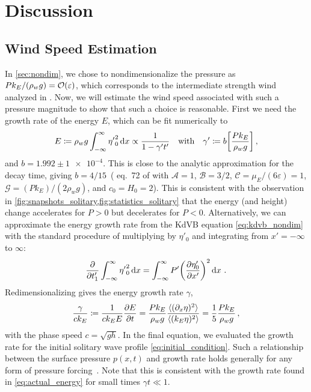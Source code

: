 \documentclass{jfm}
\renewcommand*{\epsilon}{\varepsilon}
\begin{document}
\section{\label{sec:discussion} Discussion}

\subsection{\label{sec:press_mag} Wind Speed Estimation}
In \cref{sec:nondim}, we chose to nondimensionalize the pressure as
$P k_E/(\rho_w g) = \order{\epsilon}$, which corresponds to the
intermediate strength wind analyzed in \citet{zdyrski2020wind}.
Now, we will estimate the wind speed associated with such a pressure
magnitude to show that such a choice is reasonable.
First we need the growth rate of the energy $E$, which can be fit
numerically to
\begin{equation}
  E \coloneqq \rho_w g \int_{-\infty}^{\infty} {\eta'}_0^2 \dd{x}
  \propto \frac{1}{1 - \gamma' t'}
  \qq{with}
  \gamma' \coloneqq b \bqty{\frac{P k_E}{\rho_w g}}
  \,,
  \label{eq:actual_energy}
\end{equation}
and $b = 1.992 \pm \num{1e-4}$.
This is close to the analytic approximation for the decay time, giving
$b = 4/15$~(\eg{} eq.\ 72 of \citealp{zdyrski2019effects} with
$\mathcal{A}=1$, $\mathcal{B} = 3/2$, $\mathcal{C} = \mu_E/(6\epsilon) =
1$, $\mathcal{G} = (P k_E)/(2 \rho_w g)$, and $c_0 = H_0 = 2$).
This is consistent with the observation in
\cref{fig:snapshots_solitary,fig:statistics_solitary} that the energy
(and height) change accelerates for $P>0$ but decelerates for $P<0$.
Alternatively, we can approximate the energy growth rate from the KdVB
equation \cref{eq:kdvb_nondim} with the standard procedure
\citep[\eg][]{mei2005nonlinear} of multiplying by $\eta'_0$ and
integrating from $x'=-\infty$ to $\infty$:
\begin{equation}
  \pdv{t'_1} \int_{-\infty}^{\infty} {\eta'}_0^2 \dd{x}
  = \int_{-\infty}^{\infty} P' \pqty{\pdv{\eta'_0}{x'}}^2
  \dd{x} \,.
\end{equation}
Redimensionalizing gives the energy growth rate $\gamma$,
\begin{equation}
  \frac{\gamma}{c k_E} \coloneqq
  \frac{1}{c k_E E} \pdv{E}{t}
  = \frac{P k_E}{\rho_w g} \frac{\langle (\partial_x \eta)^2 \rangle}
    {\langle (k_E \eta)^2 \rangle}
  = \frac{1}{5} \frac{P k_E}{\rho_w g}
  \,,
  \label{eq:gamma_vs_P_solitary}
\end{equation}
with the phase speed $c = \sqrt{gh}$.
In the final equation, we evaluated the growth rate for the initial
solitary wave profile \cref{eq:initial_condition}.
Such a relationship between the surface pressure $p(x,t)$ and growth
rate holds generally for any form of pressure
forcing~\citep[\eg][]{peirson2008wind}.
Note that this is consistent with the growth rate found in
\cref{eq:actual_energy} for small times $\gamma t \ll 1$.
\end{document}
